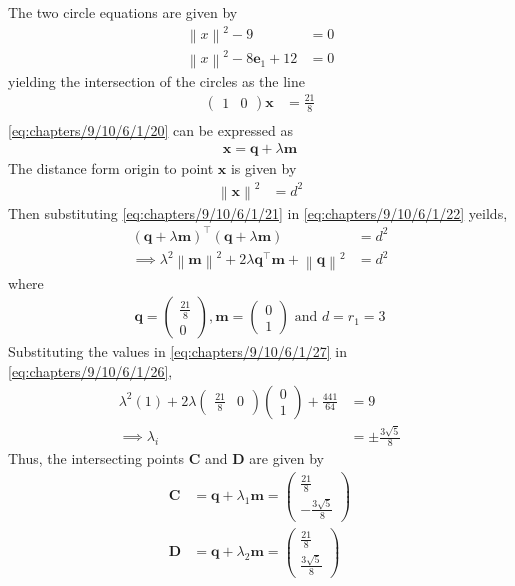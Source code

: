 \documentclass[12pt]{article}
\providecommand{\norm}[1]{\left\lVert#1\right\rVert}
\newcommand{\myvec}[1]{\ensuremath{\begin{pmatrix}#1\end{pmatrix}}}
\let\vec\mathbf
\let\vec\mathbf
\providecommand{\brak}[1]{\ensuremath{\left(#1\right)}}
\providecommand{\brak}[1]{\ensuremath{\left(#1\right)}}
\providecommand{\norm}[1]{\left\lVert#1\right\rVert}
\let\vec\mathbf
\begin{document}
\begin{table}[h!]
	\small
	\centering
     
	\label{tab:chapters/9/10/6/1/table1}
\end{table}
 The two circle equations are given by
\begin{align}
\label{eq:chapters/9/10/6/1/1}
	\norm{x}^2-9&=0\\
	\norm{x}^2-8\vec{e}_1+12&=0
\end{align}
yielding the intersection of the circles as the line
\begin{align}
\myvec{1&0}\vec{x}&=\frac{21}{8}\\
\label{eq:chapters/9/10/6/1/20}
\end{align}
		\eqref{eq:chapters/9/10/6/1/20} can be expressed as
\begin{align}
	\vec{x}=\vec{q}+\lambda\vec{m}\label{eq:chapters/9/10/6/1/21}
\end{align}
The distance form origin to point $\vec{x}$ is given by
\begin{align}
	\norm{\vec{x}}^2&=d^2\label{eq:chapters/9/10/6/1/22}
\end{align}
		Then substituting \eqref{eq:chapters/9/10/6/1/21} in \eqref{eq:chapters/9/10/6/1/22} yeilds,
\begin{align}
	\brak{\vec{q}+\lambda\vec{m}}^{\top}\brak{\vec{q}+\lambda\vec{m}}&=d^2\\
	\implies \lambda^2\norm{\vec{m}}^2+2\lambda\vec{q}^{\top}\vec{m}+\norm{\vec{q}}^2&=d^2\label{eq:chapters/9/10/6/1/26}
\end{align}
where
\begin{align}
	\vec{q}=\myvec{\frac{21}{8}\\0},\vec{m}=\myvec{0\\1} \text{ and } d=r_1=3
	\label{eq:chapters/9/10/6/1/27}
\end{align}
		Substituting the values in \eqref{eq:chapters/9/10/6/1/27} in \eqref{eq:chapters/9/10/6/1/26}, 
\begin{align}
	\lambda^2(1)+2\lambda\myvec{\frac{21}{8}&0}\myvec{0\\1}+\frac{441}{64}&=9\\
	\implies\lambda_i&=\pm\frac{3\sqrt{5}}{8}
\end{align}
Thus, 
the intersecting points $\vec{C}$ and $\vec{D}$ are given by
\begin{align}
    \vec{C}&=\vec{q}+\lambda_1\vec{m}=\myvec{\frac{21}{8}\\[2pt]-\frac{3\sqrt{5}}{8}}\\
    \vec{D}&=\vec{q}+\lambda_2\vec{m}=\myvec{\frac{21}{8}\\[2pt]\frac{3\sqrt{5}}{8}}
\end{align}
\end{document}
